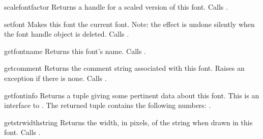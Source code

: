 \begin{funcdesc}{scalefont}{factor}
Returns a handle for a scaled version of this font.
Calls .
\end{funcdesc}

\begin{funcdesc}{setfont}{}
Makes this font the current font.
Note: the effect is undone silently when the font handle object is
deleted.
Calls .
\end{funcdesc}

\begin{funcdesc}{getfontname}{}
Returns this font's name.
Calls .
\end{funcdesc}

\begin{funcdesc}{getcomment}{}
Returns the comment string associated with this font.
Raises an exception if there is none.
Calls .
\end{funcdesc}

\begin{funcdesc}{getfontinfo}{}
Returns a tuple giving some pertinent data about this font.
This is an interface to .
The returned tuple contains the following numbers:
.
\end{funcdesc}

\begin{funcdesc}{getstrwidth}{string}
Returns the width, in pixels, of the string when drawn in this font.
Calls .
\end{funcdesc}
